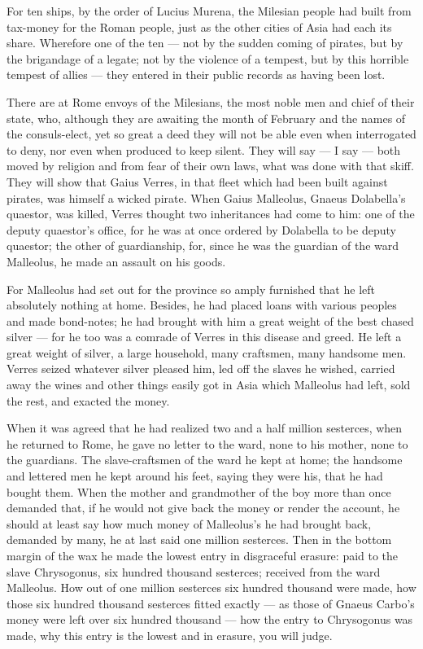  For ten ships, by the order of Lucius Murena, the Milesian people had built from tax-money for the Roman people, just as the other cities of Asia had each its share. Wherefore one of the ten --- not by the sudden coming of pirates, but by the brigandage of a legate; not by the violence of a tempest, but by this horrible tempest of allies --- they entered in their public records as having been lost.

 There are at Rome envoys of the Milesians, the most noble men and chief of their state, who, although they are awaiting the month of February and the names of the consuls-elect, yet so great a deed they will not be able even when interrogated to deny, nor even when produced to keep silent. They will say --- I say --- both moved by religion and from fear of their own laws, what was done with that skiff. They will show that Gaius Verres, in that fleet which had been built against pirates, was himself a wicked pirate. When Gaius Malleolus, Gnaeus Dolabella's quaestor, was killed, Verres thought two inheritances had come to him: one of the deputy quaestor's office, for he was at once ordered by Dolabella to be deputy quaestor; the other of guardianship, for, since he was the guardian of the ward Malleolus, he made an assault on his goods.

 For Malleolus had set out for the province so amply furnished that he left absolutely nothing at home. Besides, he had placed loans with various peoples and made bond-notes; he had brought with him a great weight of the best chased silver --- for he too was a comrade of Verres in this disease and greed. He left a great weight of silver, a large household, many craftsmen, many handsome men. Verres seized whatever silver pleased him, led off the slaves he wished, carried away the wines and other things easily got in Asia which Malleolus had left, sold the rest, and exacted the money.

 When it was agreed that he had realized two and a half million sesterces, when he returned to Rome, he gave no letter to the ward, none to his mother, none to the guardians. The slave-craftsmen of the ward he kept at home; the handsome and lettered men he kept around his feet, saying they were his, that he had bought them. When the mother and grandmother of the boy more than once demanded that, if he would not give back the money or render the account, he should at least say how much money of Malleolus's he had brought back, demanded by many, he at last said one million sesterces. Then in the bottom margin of the wax he made the lowest entry in disgraceful erasure: paid to the slave Chrysogonus, six hundred thousand sesterces; received from the ward Malleolus. How out of one million sesterces six hundred thousand were made, how those six hundred thousand sesterces fitted exactly --- as those of Gnaeus Carbo's money were left over six hundred thousand --- how the entry to Chrysogonus was made, why this entry is the lowest and in erasure, you will judge.

